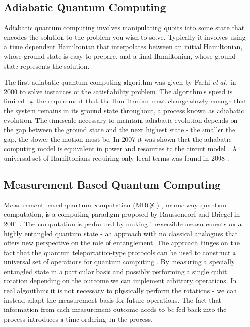\subsection{Adiabatic Quantum Computing}

Adiabatic quantum computing involves manipulating qubits into some state that encodes the solution to the problem you wish to solve. Typically it involves using a time dependent Hamiltonian that interpolates between an initial Hamiltonian, whose ground state is easy to prepare, and a final Hamiltonian, whose ground state represents the solution. 

The first adiabatic quantum computing algorithm was given by Farhi \textit{et al}.\ in 2000 \cite{adiabatic_qc} to solve instances of the satisfiability problem. The algorithm's speed is limited by the requirement that the Hamiltonian must change slowly enough that the system remains in its ground state throughout, a process known as adiabatic evolution. The timescale necessary to maintain adiabatic evolution depends on the gap between the ground state and the next highest state - the smaller the gap, the slower the motion must be. In 2007 it was shown that the adiabatic computing model is equivalent in power and resources to the circuit model \cite{adiabatic_equivalent}. A universal set of Hamiltonians requiring only local terms was found in 2008 \cite{hamiltonians_for_adiabatic_qc}.


\subsection{Measurement Based Quantum Computing}

Measurement based quantum computation (MBQC) \cite{mbqc_intro}, or one-way quantum computation, is a computing paradigm proposed by Raussendorf and Briegel in 2001 \cite{one_way_qc}.
The computation is performed by making irreversible measurements on a highly entangled quantum state - an approach with no classical analogues that offers new perspective on the role of entanglement.
The approach hinges on the fact that the quantum teleportation-type protocols can be used to construct a universal set of operations for quantum computing \cite{teleportation_universal}. By measuring a specially entangled state in a particular basis and possibly performing a single qubit rotation depending on the outcome we can implement arbitrary operations. In real algorithms it is not necessary to physically perform the rotations - we can instead adapt the measurement basis for future operations. The fact that information from each measurement outcome needs to be fed back into the process introduces a time ordering on the process. 

